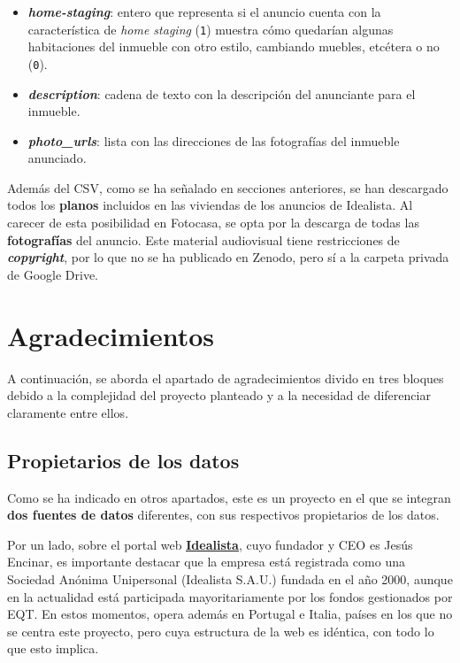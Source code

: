 \documentclass[12pt]{article}
\begin{document}
\begin{itemize}[topsep=0cm,partopsep=0cm]
	\item \textbf{\textit{home-staging}}: entero que representa si el anuncio cuenta con la característica de \textit{home staging} (\verb|1|) \textemdash muestra cómo quedarían algunas habitaciones del inmueble con otro estilo, cambiando muebles, etcétera \textemdash  o no (\verb|0|).
	\item \textbf{\textit{description}}: cadena de texto con la descripción del anunciante para el inmueble.
	\item \textbf{\textit{photo\_urls}}: lista con las direcciones de las fotografías del inmueble anunciado.
\end{itemize}

Además del CSV, como se ha señalado en secciones anteriores, se han descargado todos los \textbf{planos} incluidos en las viviendas de los anuncios de Idealista. Al carecer de esta posibilidad en Fotocasa, se opta por la descarga de todas las \textbf{fotografías} del anuncio. Este material audiovisual tiene restricciones de \textbf{\textit{copyright}}, por lo que no se ha publicado en Zenodo, pero sí a la carpeta privada de Google Drive. 

\vspace{-1.5em}\section{Agradecimientos}\vspace{-1.0em}

A continuación, se aborda el apartado de agradecimientos divido en tres bloques debido a la complejidad del proyecto planteado y a la necesidad de diferenciar claramente entre ellos. 

\vspace{-1.5em}\subsection*{Propietarios de los datos}\vspace{-1.0em}

Como se ha indicado en otros apartados, este es un proyecto en el que se integran \textbf{dos fuentes de datos} diferentes, con sus respectivos propietarios de los datos. 

Por un lado, sobre el portal web \href{http://www.idealista.com}{\textbf{\underline{Idealista}}}, cuyo fundador y CEO es Jesús Encinar, es importante destacar que la empresa está registrada como una Sociedad Anónima Unipersonal (Idealista S.A.U.) fundada en el año 2000, aunque en la actualidad está participada mayoritariamente por los fondos gestionados por EQT. En estos momentos, opera además en Portugal e Italia, países en los que no se centra este proyecto, pero cuya estructura de la web es idéntica, con todo lo que esto implica. 
\end{document}

